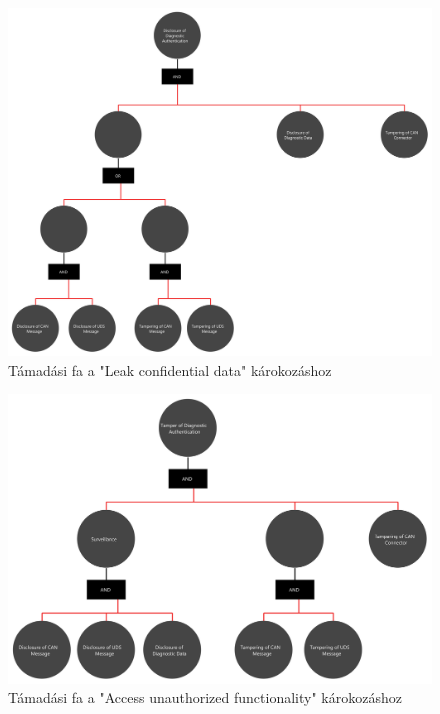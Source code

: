 \begin{figure}[!ht]
	\centering
	\includegraphics[width=120mm, keepaspectratio]{figures/AT-SECDIAG-00.png}
	\caption{Támadási fa a "Leak confidential data" károkozáshoz} 
\end{figure}
\begin{figure}[!ht]
	\centering
	\includegraphics[width=120mm, keepaspectratio]{figures/AT-SECDIAG-01.png}
	\caption{Támadási fa a "Access unauthorized functionality" károkozáshoz} 
\end{figure}
